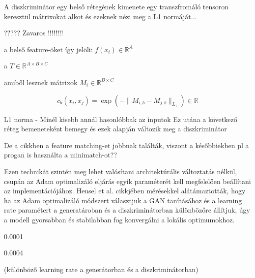 A diszkriminátor egy belső rétegének kimenete egy transzfromáló tensoron keresztül mátrixokat alkot és ezeknek nézi meg a L1 normáját...


????? Zavaros !!!!!!!!

a belső feature-öket így jelöli: $f(x_i) \in \mathbb{R}^A $

a $T \in \mathbb{R}^{A \times B \times C} $

amiből lesznek mátrixok $M_i \in \mathbb{R}^{B \times C}$

$$ c_b(x_i, x_j) = \exp(- \|M_{i,b} - M_{j,b}\|_{L_1}) \in \mathbb{R} $$

L1 norma - Minél kisebb annál hasonlóbbak az inputok
Ez utána a következő réteg bemeneteként bemegy és ezek alapján változik meg a diszkriminátor

De a cikkben a feature matching-et jobbnak találták, viszont a későbbiekben pl a progan is használta a minimatch-ot??

Ezen technikát szintén meg lehet valósítani architektúrális változtatás nélkül, csupán az Adam optimalizáló eljárás egyik paraméterét kell megfelelően beállítani az implementációjához.
Heusel et al. cikkjében mérésekkel alátámaztották, hogy ha az Adam optimalizáló módszert választjuk a GAN tanításához és a learning rate paramétert a generatároban és a diszkriminátorban különbözőre állítjuk, úgy a modell gyorsabban és stabilabban fog konvergálni a lokális optimumokhoz.

0.0001

0.0004

(különböző learning rate a generátorban és a diszkriminátorban)